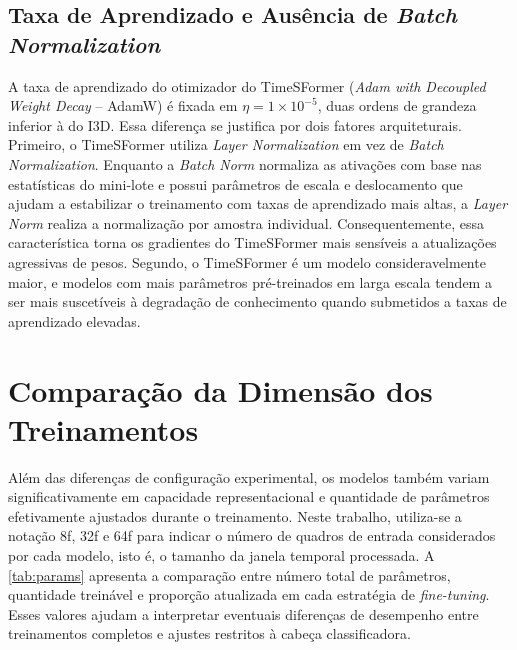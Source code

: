 \documentclass[12pt, %
openright, 
oneside, %
a4paper,    %
brazil]{facom-ufu-abntex2}
\begin{document}
\subsection[Taxa de Aprendizado e Ausência de \textit{Batch Normalization}]{Taxa de Aprendizado e Ausência de \textit{Batch Normalization}}

A taxa de aprendizado do otimizador do TimeSFormer (\textit{Adam with Decoupled Weight Decay} -- AdamW) é fixada em $\eta = 1 \times 10^{-5}$, duas ordens de grandeza inferior à do I3D.
Essa diferença se justifica por dois fatores arquiteturais. Primeiro, o TimeSFormer utiliza \textit{Layer Normalization} em vez de \textit{Batch Normalization}. Enquanto a \textit{Batch Norm} normaliza as ativações com base nas estatísticas do mini-lote e possui parâmetros de escala e deslocamento que ajudam a estabilizar o treinamento com taxas de aprendizado mais altas, a \textit{Layer Norm} realiza a normalização por amostra individual. Consequentemente, essa característica torna os gradientes do TimeSFormer mais sensíveis a atualizações agressivas de pesos.
Segundo, o TimeSFormer é um modelo consideravelmente maior, e modelos com mais parâmetros pré-treinados em larga escala tendem a ser mais suscetíveis à degradação de conhecimento quando submetidos a taxas de aprendizado elevadas.

\section[Comparação da Dimensão dos Treinamentos]{Comparação da Dimensão dos Treinamentos}

Além das diferenças de configuração experimental, os modelos também variam significativamente em capacidade representacional e quantidade de parâmetros efetivamente ajustados durante o treinamento. Neste trabalho, utiliza-se a notação 8f, 32f e 64f para indicar o número de quadros de entrada considerados por cada modelo, isto é, o tamanho da janela temporal processada. A \autoref{tab:params} apresenta a comparação entre número total de parâmetros, quantidade treinável e proporção atualizada em cada estratégia de \textit{fine-tuning}. Esses valores ajudam a interpretar eventuais diferenças de desempenho entre treinamentos completos e ajustes restritos à cabeça classificadora.
\end{document}
